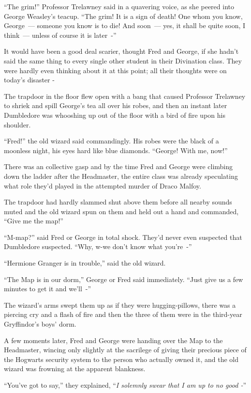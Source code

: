 ``The grim!'' Professor Trelawney said in a quavering voice, as she peered into George Weasley's teacup. ``The grim! It is a sign of death! One whom you know, George~--- someone you know is to die! And soon~--- yes, it shall be quite soon, I think~--- unless of course it is later~-''

It would have been a good deal scarier, thought Fred and George, if she hadn't said the same thing to every single other student in their Divination class. They were hardly even thinking about it at this point; all their thoughts were on today's disaster -

The trapdoor in the floor flew open with a bang that caused Professor Trelawney to shriek and spill George's tea all over his robes, and then an instant later Dumbledore was whooshing up out of the floor with a bird of fire upon his shoulder.

``Fred!'' the old wizard said commandingly. His robes were the black of a moonless night, his eyes hard like blue diamonds. ``George! With me, now!''

There was an collective gasp and by the time Fred and George were climbing down the ladder after the Headmaster, the entire class was already speculating what role they'd played in the attempted murder of Draco Malfoy.

The trapdoor had hardly slammed shut above them before all nearby sounds muted and the old wizard spun on them and held out a hand and commanded, ``Give me the map!''

``M-map?'' said Fred or George in total shock. They'd never even suspected that Dumbledore suspected. ``Why, w-we don't know what you're~-''

``Hermione Granger is in trouble,'' said the old wizard.

``The Map is in our dorm,'' George or Fred said immediately. ``Just give us a few minutes to get it and we'll~-''

The wizard's arms swept them up as if they were hugging-pillows, there was a piercing cry and a flash of fire and then the three of them were in the third-year Gryffindor's boys' dorm.

A few moments later, Fred and George were handing over the Map to the Headmaster, wincing only slightly at the sacrilege of giving their precious piece of the Hogwarts security system to the person who actually owned it, and the old wizard was frowning at the apparent blankness.

``You've got to say,'' they explained, ``\emph{I solemnly swear that I am up to no good -}''

